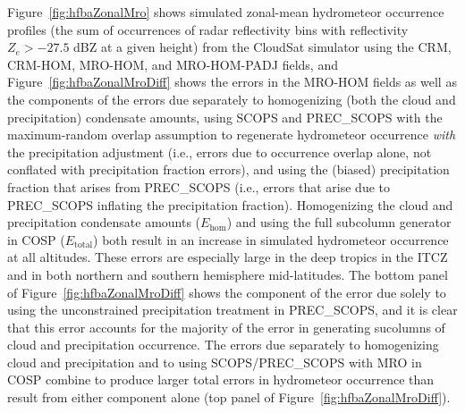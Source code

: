 Figure~\ref{fig:hfbaZonalMro} shows simulated zonal-mean hydrometeor
occurrence profiles (the sum of occurrences of radar reflectivity bins
with reflectivity \(Z_e > -27.5\) dBZ at a given height) from the
CloudSat simulator using the CRM, CRM-HOM, MRO-HOM, and MRO-HOM-PADJ
fields, and Figure~\ref{fig:hfbaZonalMroDiff} shows the errors in the
MRO-HOM fields as well as the components of the errors due separately to
homogenizing (both the cloud and precipitation) condensate amounts,
using SCOPS and PREC\_SCOPS with the maximum-random overlap assumption
to regenerate hydrometeor occurrence \emph{with} the precipitation
adjustment (i.e., errors due to occurrence overlap alone, not conflated
with precipitation fraction errors), and using the (biased)
precipitation fraction that arises from PREC\_SCOPS (i.e., errors that
arise due to PREC\_SCOPS inflating the precipitation fraction).
Homogenizing the cloud and precipitation condensate amounts
(\(E_\textrm{hom}\)) and using the full subcolumn generator in COSP
(\(E_\textrm{total}\)) both result in an increase in simulated
hydrometeor occurrence at all altitudes. These errors are especially
large in the deep tropics in the ITCZ and in both northern and southern
hemisphere mid-latitudes. The bottom panel of
Figure~\ref{fig:hfbaZonalMroDiff} shows the component of the error due
solely to using the unconstrained precipitation treatment in
PREC\_SCOPS, and it is clear that this error accounts for the majority
of the error in generating sucolumns of cloud and precipitation
occurrence. The errors due separately to homogenizing cloud and
precipitation and to using SCOPS/PREC\_SCOPS with MRO in COSP combine to
produce larger total errors in hydrometeor occurrence than result from
either component alone (top panel of Figure~\ref{fig:hfbaZonalMroDiff}).

